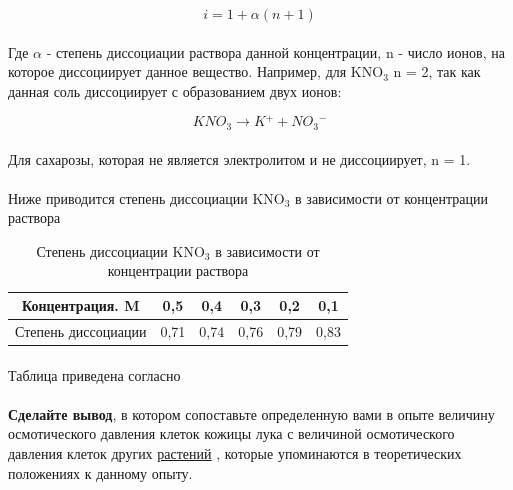 \begin{equation}
	\label{i_isotonik}
	i = 1 + \alpha(n + 1)
\end{equation}

\paragraph*{}Где $\alpha$ - степень диссоциации раствора данной концентрации, n - число ионов, на которое диссоциирует данное вещество. Например, для KNO$_3$ n = 2, так как данная соль диссоциирует с образованием двух ионов:

\begin{equation}
	KNO_3 \rightarrow K{^+} + NO{_3}{^-}
\end{equation}

\paragraph*{}Для сахарозы, которая не является электролитом и не диссоциирует, n = 1.

\paragraph*{}Ниже приводится степень диссоциации KNO$_3$ в зависимости от концентрации раствора

\begin{table}[h!]
\centering
\caption{Степень диссоциации KNO$_3$ в зависимости от концентрации раствора}
	\begin{tabular}{|c|c|c|c|c|c|}
	
	\hline Концентрация. M     & 0,5  & 0,4  & 0,3  & 0,2  & 0,1 \\
	\hline Степень диссоциации & 0,71 & 0,74 & 0,76 & 0,79 & 0,83 \\
	\hline
	\end{tabular}
	
\paragraph*{}Таблица приведена согласно \cite{vorob_2013}
\end{table}

\paragraph*{}\textbf{Сделайте вывод}, в котором сопоставьте определенную вами в опыте величину осмотического давления клеток кожицы лука с величиной осмотического давления клеток других \hyperlink{p_osm_other_plants}{растений} , которые упоминаются в теоретических положениях к данному опыту.

